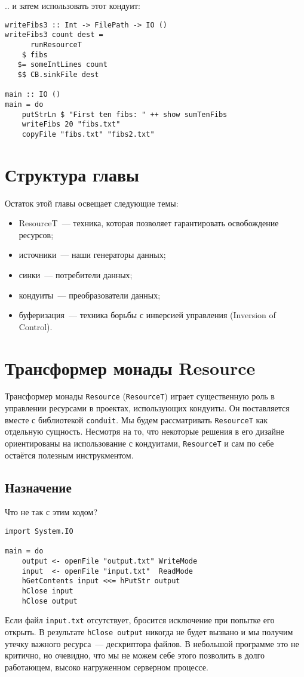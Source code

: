 .. и затем использовать этот кондуит:
\begin{lstlisting}
writeFibs3 :: Int -> FilePath -> IO ()
writeFibs3 count dest =
      runResourceT
    $ fibs
   $= someIntLines count
   $$ CB.sinkFile dest

main :: IO ()
main = do
    putStrLn $ "First ten fibs: " ++ show sumTenFibs
    writeFibs 20 "fibs.txt"
    copyFile "fibs.txt" "fibs2.txt"
\end{lstlisting}

\section{Структура главы}

Остаток этой главы освещает следующие темы:
\begin{itemize}
 \item ResourceT~--- техника, которая позволяет гарантировать освобождение ресурсов;
 \item источники~--- наши генераторы данных;
 \item синки~--- потребители данных;
 \item кондуиты~--- преобразователи данных;
 \item буферизация~--- техника борьбы с инверсией управления (Inversion of Control).
\end{itemize}

\section{Трансформер монады Resource}

Трансформер монады \verb*|Resource| (\verb*|ResourceT|) играет существенную роль в управлении ресурсами в
проектах, использующих кондуиты. Он поставляется вместе с библиотекой \verb=conduit=. 
Мы будем рассматривать \verb*|ResourceT| как отдельную сущность. Несмотря на то, что некоторые решения в его дизайне ориентированы на использование с кондуитами, \verb*|ResourceT| и сам по себе остаётся полезным инструкментом.

\subsection{Назначение}
Что не так с этим кодом?
\begin{lstlisting}
import System.IO

main = do
    output <- openFile "output.txt" WriteMode
    input  <- openFile "input.txt"  ReadMode
    hGetContents input <<= hPutStr output
    hClose input
    hClose output
\end{lstlisting}
Если файл \verb*|input.txt| отсутствует, бросится исключение при попытке его открыть. В
результате \lstinline'hClose output' никогда не будет вызвано и мы получим утечку важного ресурса~--- дескриптора файлов. В небольшой программе это не критично, но очевидно, что мы не
можем себе этого позволить в долго работающем, высоко нагруженном серверном процессе.


